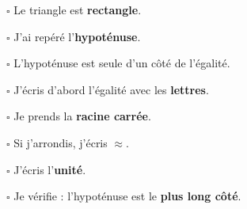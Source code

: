 \documentclass[12pt,a4paper]{article}
\begin{document}
\begin{tcolorbox}[
  enhanced,
  colback=ActionC!5,
  colframe=ActionC!55,
  boxrule=0.6pt,
  arc=2mm,
  left=4mm,
  right=4mm,
  top=1.2mm,
  bottom=1.2mm
]

\begin{minipage}[t]{0.48\linewidth}

\(\square\) Le triangle est \textbf{rectangle}.

\smallskip

\(\square\) J'ai repéré l'\textbf{hypoténuse}.

\smallskip

\(\square\) L'hypoténuse est seule d'un côté de l'égalité.

\smallskip

\(\square\) J'écris d'abord l'égalité avec les \textbf{lettres}.

\end{minipage}
\hfill
\begin{minipage}[t]{0.48\linewidth}

\(\square\) Je prends la \textbf{racine carrée}.

\smallskip

\(\square\) Si j'arrondis, j'écris \(\approx\).

\smallskip

\(\square\) J'écris l'\textbf{unité}.

\smallskip

\(\square\) Je vérifie : l'hypoténuse est le \textbf{plus long côté}.

\end{minipage}

\end{tcolorbox}
\end{document}
